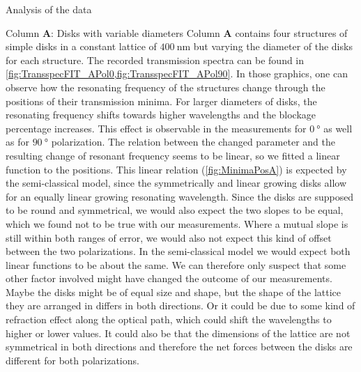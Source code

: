\documentclass[pdftex, a4paper,11pt, twoside, UKenglish]{report}
\begin{document}
\begin{chapter}{Analysis of the data}
    
    
    \begin{section}{Column \textbf{A}: Disks with variable diameters}
      \label{chp:DataA}
      Column \textbf{A} contains four structures of simple disks in a constant
      lattice of $\SI{400}{\nano\meter}$ but varying the diameter of the disks
      for each structure. The recorded transmission spectra can be found in
      \cref{fig:TransspecFIT_APol0,fig:TransspecFIT_APol90}.
      In those graphics, one can observe how the resonating frequency of the
      structures change through the positions of their transmission minima.
      For larger diameters of disks, the resonating frequency shifts towards
      higher wavelengths and the blockage percentage increases.
      This effect is observable in the measurements for $\SI{0}{\degree}$ as
      well as for $\SI{90}{\degree}$ polarization. The relation between the
      changed parameter and the resulting change of resonant frequency seems to
      be linear, so we fitted a linear function to the positions.
      This linear relation (\cref{fig:MinimaPosA}) is expected by the
      semi-classical model, since the symmetrically and linear growing disks
      allow for an equally linear growing resonating wavelength. Since the
      disks are supposed to be round and symmetrical, we would also expect the
      two slopes to be equal, which we found not to be true with our
      measurements. Where a mutual slope is still within both ranges of
      error, we would also not expect this kind of offset between the two
      polarizations. In the semi-classical model we would expect both linear
      functions to be about the same. We can therefore only suspect that
      some other factor involved might have changed the outcome of our
      measurements. Maybe the disks might be of equal size and shape, but the
      shape of the lattice they are arranged in differs in both directions.
      Or it could be due to some kind of refraction effect along the optical
      path, which could shift the wavelengths to higher or lower values.
      It could also be that the dimensions of the lattice are not symmetrical
      in both directions and therefore the net forces between the disks are
      different for both polarizations.
      \begin{figure}[b!]
        \centering

\end{figure}
\end{section}
\end{chapter}
\end{document}

